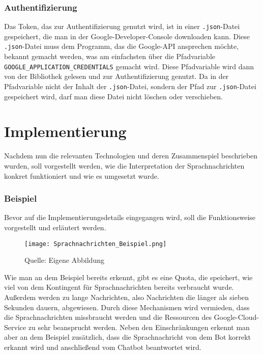 \subsubsection{Authentifizierung}
Das Token, das zur Authentifizierung genutzt wird, ist in einer \texttt{.json}-Datei gespeichert, die man in der Google-Developer-Console downloaden kann. Diese \texttt{.json}-Datei muss dem Programm, das die Google-API ansprechen möchte, bekannt gemacht werden, was am einfachsten über die Pfadvariable \texttt{GOOGLE\_APPLICATION\_CREDENTIALS} gemacht wird. Diese Pfadvariable wird dann von der Bibliothek gelesen und zur Authentifizierung genutzt. Da in der Pfadvariable nicht der Inhalt der \texttt{.json}-Datei, sondern der Pfad zur \texttt{.json}-Datei gespeichert wird, darf man diese Datei nicht löschen oder verschieben.

\section{Implementierung}
Nachdem nun die relevanten Technologien und deren Zusammenspiel beschrieben wurden, soll vorgestellt werden, wie die Interpretation der Sprachnachrichten konkret funktioniert und wie es umgesetzt wurde.

\subsubsection{Beispiel}
Bevor auf die Implementierungsdetails eingegangen wird, soll die Funktionsweise vorgestellt und erläutert werden.

\begin{figure}[H]
    \centering
    \caption{Beispiel der Verwendung von Speech-to-Text}
      \texttt{[image: Sprachnachrichten\_Beispiel.png]}
      \label{img:speekExample}
    \caption*{Quelle: Eigene Abbildung}
\end{figure}

Wie man an dem Beispiel bereits erkennt, gibt es eine Quota, die speichert, wie viel von dem Kontingent für Sprachnachrichten bereits verbraucht wurde. Außerdem werden zu lange Nachrichten, also Nachrichten die länger als sieben Sekunden dauern, abgewiesen. Durch diese Mechanismen wird vermieden, dass die Sprachnachrichten missbraucht werden und die Ressourcen des Google-Cloud-Service zu sehr beansprucht werden.
Neben den Einschränkungen erkennt man aber an dem Beispiel zusätzlich, dass die Sprachnachricht von dem Bot korrekt erkannt wird und anschließend vom Chatbot beantwortet wird.

